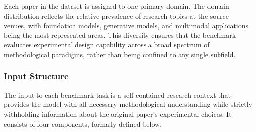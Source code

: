 Each paper in the dataset is assigned to one primary domain. The domain distribution reflects the relative prevalence of research topics at the source venues, with foundation models, generative models, and multimodal applications being the most represented areas. This diversity ensures that the benchmark evaluates experimental design capability across a broad spectrum of methodological paradigms, rather than being confined to any single subfield.

\subsubsection{Input Structure}

The input to each benchmark task is a self-contained research context that provides the model with all necessary methodological understanding while strictly withholding information about the original paper's experimental choices. It consists of four components, formally defined below.

